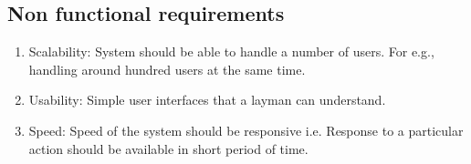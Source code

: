 \subsection{Non functional requirements}
\begin{enumerate} 
\item Scalability: System should be able to handle a number of users. 
For e.g., handling around hundred users at the same time.
\item Usability: Simple user interfaces that a layman can understand.
\item Speed: Speed of the system should be responsive i.e. Response to
 a particular action should be available in short period of time. 
\end{enumerate}








